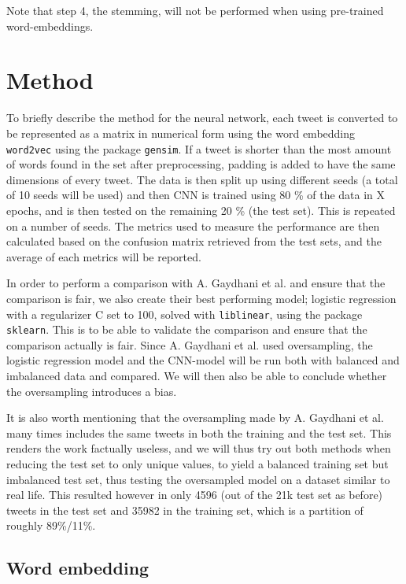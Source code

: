 \documentclass[twocolumn]{article}
\begin{document}
Note that step 4, the stemming, will not be performed when using pre-trained word-embeddings. 

\section{Method}

To briefly describe the method for the neural network, each tweet is converted to be represented as a matrix in numerical form using the word embedding \verb|word2vec| using the package \verb|gensim|. If a tweet is shorter than the most amount of words found in the set after preprocessing, padding is added to have the same dimensions of every tweet. The data is then split up using different seeds (a total of 10 seeds will be used) and then CNN is trained using 80 \% of the data in X epochs, and is then tested on the remaining 20 \% (the test set). This is repeated on a number of seeds. The metrics used to measure the performance are then calculated based on the confusion matrix retrieved from the test sets, and the average of each metrics will be reported. 

In order to perform a comparison with A. Gaydhani et al. \cite{gaydhani} and ensure that the comparison is fair, we also create their best performing model; logistic regression with a regularizer C set to 100, solved with \verb|liblinear|, using the package \verb|sklearn|. This is to be able to validate the comparison and ensure that the comparison actually is fair. Since A. Gaydhani et al. used oversampling, the logistic regression model and the CNN-model will be run both with balanced and imbalanced data and compared. We will then also be able to conclude whether the oversampling introduces a bias. 

It is also worth mentioning that the oversampling made by A. Gaydhani et al. many times includes the same tweets in both the training and the test set. This renders the work factually useless, and we will thus try out both methods when reducing the test set to only unique values, to yield a balanced training set but imbalanced test set, thus testing the oversampled model on a dataset similar to real life. This resulted however in only 4596 (out of the 21k test set as before) tweets in the test set and 35982 in the training set, which is a partition of roughly 89\%/11\%.

\subsection{Word embedding}
\end{document}

